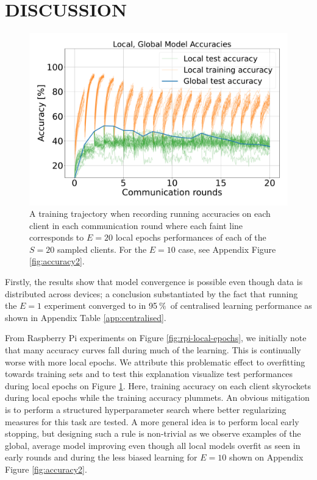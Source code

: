 \documentclass{article}
\newcommand{\unit}[1]{\ensuremath{\:\text{#1}}}
\newcommand{\pro}{\ensuremath{\unit{\%{}}}}
\begin{document}
\section{DISCUSSION}%
\label{sec:discussion}

\begin{figure}[htb!]
    \centering
        \includegraphics[width=\linewidth]{imgs/accuracy.pdf}
    \caption{
        A training trajectory when recording running accuracies on each client in each communication round where each faint line corresponds to $E=20$ local epochs performances of each of the $S=20$ sampled clients.
        For the $E=10$ case, see Appendix Figure \ref{fig:accuracy2}.
    }
    \label{fig:accuracy}
\end{figure}\noindent
Firstly, the results show that model convergence is possible even though data is distributed across devices; a conclusion substantiated by the fact that running the $E=1$ experiment converged to in 95\pro\ of centralised learning performance as shown in Appendix Table \ref{app:centralised}.

From Raspberry Pi experiments on Figure \ref{fig:rpi-local-epochs}, we initially note that many accuracy curves fall during much of the learning.
This is continually worse with more local epochs.
We attribute this problematic effect to overfitting towards training sets and to test this explanation visualize test performances during local epochs on Figure \ref{fig:accuracy}.
Here, training accuracy on each client skyrockets during local epochs while the training accuracy plummets.
An obvious mitigation is to perform a structured hyperparameter search where better regularizing measures for this task are tested.
A more general idea is to perform local early stopping, but designing such a rule is non-trivial as we observe examples of the global, average model improving even though all local models overfit as seen in early rounds and during the less biased learning for $E=10$ shown on Appendix Figure \ref{fig:accuracy2}.
\end{document}
